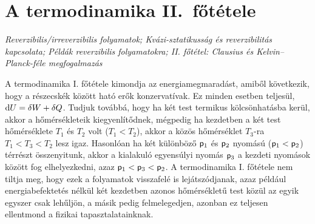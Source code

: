 \section{A termodinamika II.\ főtétele}
\emph{Reverzibilis/irreverzibilis folyamatok; Kvázi-sztatikusság és reverzibilitás kapcsolata; Példák reverzibilis folyamatokra; II. főtétel: Clausius és Kelvin--Planck-féle megfogalmazás}

A termodinamika I. főtétele kimondja az energiamegmaradást, amiből következik, hogy a részecskék között ható erők konzervatívak. Ez minden esetben teljesül, $\mathrm{d}U = \delta W + \delta Q$. Tudjuk továbbá, hogy ha két test termikus kölcsönhatásba kerül, akkor a hőmérsékleteik kiegyenlítődnek, mégpedig ha kezdetben a két test hőmérséklete $T_1$ és $T_2$ volt ($T_1<T_2$), akkor a közös hőmérséklet $T_3$-ra $T_1<T_3<T_2$ lesz igaz. Hasonlóan ha két különböző $\mathsf p_1$ és $\mathsf p_2$ nyomású ($\mathsf p_1<\mathsf p_2$) térrészt összenyitunk, akkor a kialakuló egyensúlyi nyomás $\mathsf p_3$ a kezdeti nyomások között fog elhelyezkedni, azaz $\mathsf p_1<\mathsf p_3<\mathsf p_2$. A termodinamika I. főtétele nem tiltja meg, hogy ezek a folyamatok visszafelé is lejátszódjanak, azaz például energiabefektetés nélkül két kezdetben azonos hőmérsékletű test közül az egyik egyszer csak lehűljön, a másik pedig felmelegedjen, azonban ez teljesen ellentmond a fizikai tapasztalatainknak.

